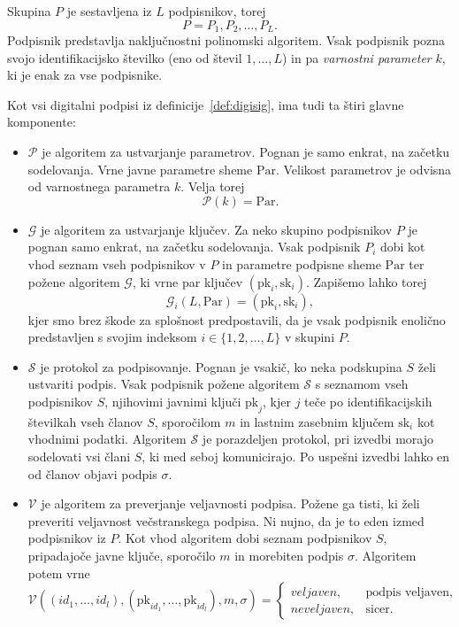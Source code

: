 \documentclass[isrm2, tisk]{fmfdelo}
\begin{document}
\begin{definicija}
\label{def:asm}
    Skupina $P$ je sestavljena iz $L$ podpisnikov, torej
    $$
    P = P_1, P_2, \dots, P_L.
    $$
    Podpisnik predstavlja naključnostni polinomski algoritem. Vsak podpisnik pozna svojo 
    identifikacijsko številko (eno od števil $1, \dots, L$) in pa \textit{varnostni parameter} $k$,
    ki je enak za vse podpisnike.

    Kot vsi digitalni podpisi iz definicije~\ref{def:digisig}, ima tudi ta štiri glavne komponente:
    \begin{itemize}
        \item $\mathcal{P}$ je algoritem za ustvarjanje parametrov. Pognan je samo enkrat, na začetku
            sodelovanja. Vrne javne parametre sheme $\text{Par}$. Velikost parametrov je odvisna od
            varnostnega parametra $k$. Velja torej
            $$
            \mathcal{P}(k) = \text{Par}.
            $$
        \item $\mathcal{G}$ je algoritem za ustvarjanje ključev. Za neko skupino podpisnikov $P$ je pognan samo
            enkrat, na začetku sodelovanja. Vsak podpisnik $P_i$ dobi kot vhod seznam vseh podpisnikov v $P$
            in parametre podpisne sheme $\text{Par}$ ter požene algoritem $\mathcal{G}$, ki vrne par ključev
            $(\text{pk}_i, \text{sk}_i)$. Zapišemo lahko torej
            $$
            \mathcal{G}_i(L, \text{Par}) = (\text{pk}_i, \text{sk}_i),
            $$
            kjer smo brez škode za splošnost predpostavili, da je vsak podpisnik enolično predstavljen
            s svojim indeksom $i \in \{1, 2, \dots, L\}$ v skupini $P$.
        \item $\mathcal{S}$ je protokol za podpisovanje. Pognan je vsakič, ko neka podskupina $S$ želi
            ustvariti podpis. Vsak podpisnik požene algoritem $\mathcal{S}$ s seznamom vseh podpisnikov
            $S$, njihovimi javnimi ključi $\text{pk}_j$, kjer $j$ teče po identifikacijskih številkah
            vseh članov $S$, sporočilom $m$ in lastnim zasebnim ključem $\text{sk}_i$ kot vhodnimi
            podatki. Algoritem $\mathcal{S}$ je porazdeljen protokol, pri izvedbi morajo sodelovati
            vsi člani $S$, ki med seboj komunicirajo. Po uspešni izvedbi lahko en od članov objavi
            podpis $\sigma$.
        \item $\mathcal{V}$ je algoritem za preverjanje veljavnosti podpisa. Požene ga tisti, ki želi 
            preveriti veljavnost večstranskega podpisa. Ni nujno, da je to eden izmed podpisnikov iz $P$. 
            Kot vhod algoritem dobi seznam podpisnikov $S$, pripadajoče javne ključe, sporočilo $m$ in 
            morebiten podpis $\sigma$. Algoritem potem vrne
            $$ 
            \mathcal{V}((id_1, \dots, id_l), (\text{pk}_{id_1}, \dots, \text{pk}_{id_l}), m, \sigma) = 
            \begin{cases}
                veljaven, & \text{podpis veljaven}, \\
                neveljaven, & \text{sicer}.
            \end{cases}
            $$
    \end{itemize}
\end{definicija}
\end{document}
